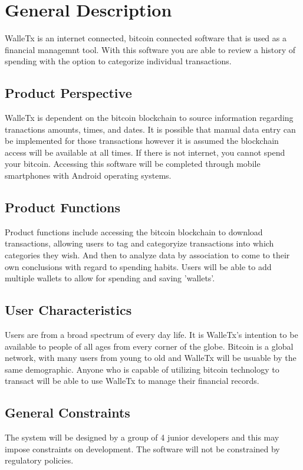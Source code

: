 \section{General Description}
  WalleTx is an internet connected, bitcoin connected software that is used as a financial managemnt tool. With this software you are able to review a history of spending with the option to categorize individual transactions. 
  \subsection{Product Perspective}
  WalleTx is dependent on the bitcoin blockchain to source information regarding tranactions amounts, times, and dates. It is possible that manual data entry can be implemented for those transactions however it is assumed the blockchain access will be available at all times. If there is not internet, you cannot spend your bitcoin. Accessing this software will be completed through mobile smartphones with Android operating systems.
  \subsection{Product Functions}
  Product functions include accessing the bitcoin blockchain to download transactions, allowing users to tag and categoryize transactions into which categories they wish. And then to analyze data by association to come to their own conclusions with regard to spending habits. Users will be able to add multiple wallets to allow for spending and saving 'wallets'. 
  \subsection{User Characteristics}
  Users are from a broad spectrum of every day life. It is WalleTx's intention to be available to people of all ages from every corner of the globe. Bitcoin is a global network, with many users from young to old and WalleTx will be usuable by the same demographic.  Anyone who is capable of utilizing bitcoin technology to transact will be able to use WalleTx to manage their financial records. 
  \subsection{General Constraints}
  The system will be designed by a group of 4 junior developers and this may impose constraints on development. The software will not be constrained by regulatory policies.

